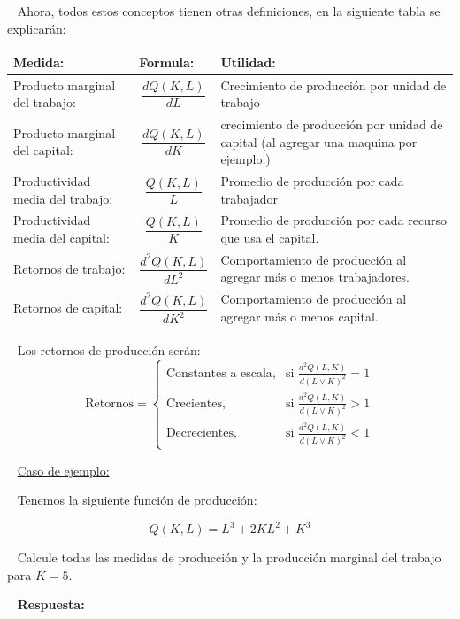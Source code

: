 \documentclass[
  letterpaper,
  DIV=11,
  numbers=noendperiod]{scrreport}
\begin{document}
~ Ahora, todos estos conceptos tienen otras definiciones, en la
siguiente tabla se explicarán:

\begin{table}[h]
    \centering
    \begin{tabular}{|p{40mm}|p{40mm}|p{40mm}|}
        \hline
        Medida: & Formula: & Utilidad: \\\hline
        Producto marginal del trabajo: & \[\frac{dQ(K,L)}{dL}\] & Crecimiento de producción por unidad de trabajo \\\hline
        Producto marginal del capital: & \[\frac{dQ(K,L)}{dK}\] & crecimiento de producción por unidad de capital (al agregar una maquina por ejemplo.) \\\hline
        Productividad media del trabajo: & \[\frac{Q(K,L)}{L}\] & Promedio de producción por cada trabajador \\\hline
        Productividad media del capital: & \[\frac{Q(K,L)}{K}\] & Promedio de producción por cada recurso que usa el capital. \\\hline
        Retornos de trabajo: & \[\frac{d^2Q(K,L)}{dL^2}\] & Comportamiento de producción al agregar más o menos trabajadores. \\\hline
        Retornos de capital: & \[\frac{d^2Q(K,L)}{dK^2}\] & Comportamiento de producción al agregar más o menos capital. \\\hline
    \end{tabular}
    
\end{table}

~ Los retornos de producción serán: \[
\text{Retornos} =
\begin{cases}
  \text{Constantes a escala}, & \text{si } \frac{d^2Q(L,K)}{d(L\vee K)^2} = 1 \\
  \text{Crecientes}, & \text{si } \frac{d^2Q(L,K)}{d(L\vee K)^2} > 1 \\
  \text{Decrecientes}, & \text{si } \frac{d^2Q(L,K)}{d(L\vee K)^2} < 1
\end{cases}
\]

~ \ul{Caso de ejemplo:}

~ Tenemos la siguiente función de producción:

\[
Q(K,L)=L^3+2KL^2+K^3
\]

~ Calcule todas las medidas de producción y la producción marginal del
trabajo para \(\bar{K}=5\).

~ \textbf{Respuesta:}
\end{document}
